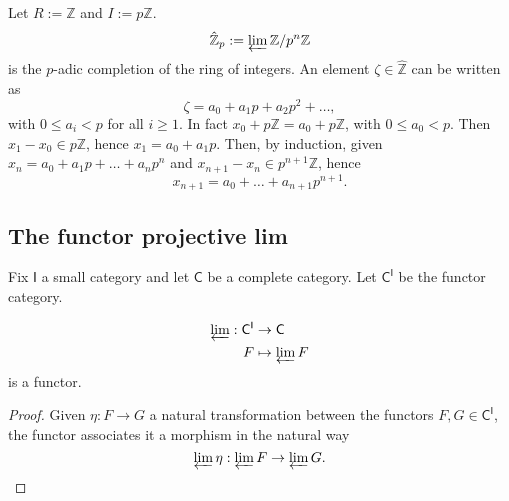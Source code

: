 \begin{ex}
	Let $R := \mathbb{Z}$ and $I := p  \mathbb{Z}$.
	\begin{equation}
		\hat{\mathbb{Z}}_p := \varprojlim \mathbb{Z}/p^n \mathbb{Z}
	\end{equation} 
	is the $p$-adic completion of the ring of integers.
	An element $\zeta \in \hat{\mathbb{Z}}$ can be written as
	\begin{equation}
	\zeta = a_0 + a_1 p + a_2 p^2 + \ldots
	,\end{equation} 
	with $0 \leq a_i < p$ for all  $i \geq 1$.
	In fact $x_0 + p \mathbb{Z} = a_0 + p\mathbb{Z}$, with $0 \leq a_0 < p$.
	Then $x_1 - x_0 \in p \mathbb{Z}$, hence $x_1 = a_0 + a_1 p$.
	Then, by induction, given  $x_n = a_0 + a_1 p + \ldots + a_{n} p^{n}$ and $x_{n+1} - x_n \in p^{n+1} \mathbb{Z}$, hence
	\begin{equation}
	x_{n+1} = a_0 + \ldots + a_{n+1} p^{n+1}
	.\end{equation} 
\end{ex} 

\subsection{The functor projective lim}
Fix $\mathsf{I}$ a small category and let $\mathsf{C}$ be a complete category.
Let $\mathsf{C}^{\mathsf{I}}$ be the functor category.

\begin{prop}
	\begin{align}
		\varprojlim: \mathsf{C}^{\mathsf{I}} &\to \mathsf{C} \\
		F &\mapsto \varprojlim F
	\end{align} 
	is a functor.
\end{prop} 	
\begin{proof}
	Given $\eta: F \to G$ a natural transformation between the functors
	$F, G \in \mathsf{C}^{\mathsf{I}}$, the functor associates it a morphism in the natural way
	\begin{equation*}
	\varprojlim \eta: \varprojlim F \to \varprojlim G
	.\qedhere\end{equation*} 
\end{proof}

